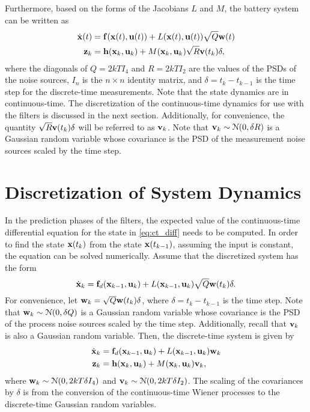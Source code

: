\documentclass[../zhang_thesis.tex]{subfiles}
\begin{document}
Furthermore, based on the forms of the Jacobians $L$ and $M$, the battery system can be written as
\begin{align}
    \dot{\mathbf{x}}(t) &= \mathbf{f}(\mathbf{x}(t),\mathbf{u}(t)) + L(\mathbf{x}(t),\mathbf{u}(t)) \sqrt{Q} \mathbf{w}(t) \label{eq:ct_diff} \\
    \mathbf{z}_k &= \mathbf{h}(\mathbf{x}_k,\mathbf{u}_k) + M(\mathbf{x}_k,\mathbf{u}_k) \sqrt{R} \mathbf{v}(t_k) \delta,
\end{align}
where the diagonals of $Q=2kT I_4$ and $R=2kT I_2$ are the values of the PSDs of the noise sources, $I_n$ is the $n\times n$ identity matrix, and $\delta=t_k-t_{k-1}$ is the time step for the discrete-time measurements. Note that the state dynamics are in continuous-time. The discretization of the continuous-time dynamics for use with the filters is discussed in the next section. Additionally, for convenience, the quantity $\sqrt{R} \mathbf{v}(t_k) \delta$ will be referred to as $\mathbf{v}_k$. Note
that $\mathbf{v}_k\sim\mathcal{N}(0,\delta R)$ is a Gaussian random variable whose covariance is the PSD of the measurement noise sources scaled by the time step.

\section{Discretization of System Dynamics}
\label{sec:discret}

In the prediction phases of the filters, the expected value of the continuous-time differential equation for the state in \cref{eq:ct_diff} needs to be computed. In order to find the state $\mathbf{x}(t_k)$ from the state $\mathbf{x}(t_{k-1})$, assuming the input is constant, the equation can be solved numerically. Assume that the discretized system has the form
\begin{equation}
    \dot{\mathbf{x}}_k = \mathbf{f}_d(\mathbf{x}_{k-1},\mathbf{u}_k) + L(\mathbf{x}_{k-1},\mathbf{u}_k) \sqrt{Q} \mathbf{w}(t_k) \delta.
\end{equation}
For convenience, let $\mathbf{w}_k=\sqrt{Q} \mathbf{w}(t_k) \delta$, where $\delta=t_k-t_{k-1}$ is the time step. Note that $\mathbf{w}_k\sim\mathcal{N}(0,\delta Q)$ is a Gaussian random variable whose covariance is the PSD of the process noise sources scaled by the time step. Additionally, recall that $\mathbf{v}_k$ is also a Gaussian random variable. Then, the discrete-time system is given by
\begin{align}
    \dot{\mathbf{x}}_k &= \mathbf{f}_d(\mathbf{x}_{k-1},\mathbf{u}_k) + L(\mathbf{x}_{k-1},\mathbf{u}_k) \mathbf{w}_k \label{eq:dt1} \\
    \mathbf{z}_k &= \mathbf{h}(\mathbf{x}_k,\mathbf{u}_k) + M(\mathbf{x}_k,\mathbf{u}_k) \mathbf{v}_k, \label{eq:dt2}
\end{align}
where $\mathbf{w}_k\sim\mathcal{N}(0,2kT\delta I_4)$ and $\mathbf{v}_k\sim\mathcal{N}(0,2kT\delta I_2)$. The scaling of the covariances by $\delta$ is from the conversion of the continuous-time Wiener processes to the discrete-time Gaussian random variables.
\end{document}
